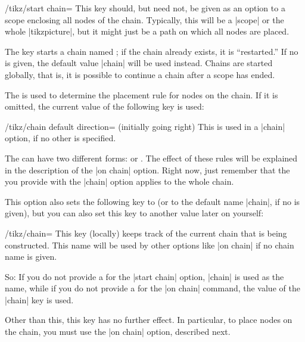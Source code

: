 \begin{key}{/tikz/start chain=}
  This key should, but need not, be given as an option to a scope
  enclosing all nodes of the chain. Typically, this will be a |scope|
  or the whole |tikzpicture|, but it might just be a path on which all
  nodes are placed.

  The key starts a chain named ; if the chain already
  exists, it is ``restarted.'' If no  is given, the
  default value |chain| will be used instead. Chains are started
  globally, that is, it is possible to continue a chain after a scope
  has ended.

  The  is used to determine the placement rule for
  nodes on the chain. If it is omitted, the current value of the
  following key is used:
  \begin{key}{/tikz/chain default direction=
      (initially going right)}
    This  is used in a |chain| option, if no other
     is specified.
  \end{key}

  The  can have two different forms:
   or
  . The effect of these rules will be
  explained in the description of the |on chain| option. Right now,
  just remember that the  you provide with the |chain|
  option applies to the whole chain.
  
  This option also sets the following key to  (or to
  the default name |chain|, if no  is given), but you
  can also set this key to another value later on yourself:
  \begin{key}{/tikz/chain=}
    This key (locally) keeps track of the current chain that is being
    constructed. This name will be used by other options like
    |on chain| if no chain name is given.

    So: If you do not provide a  for the
    |start chain| option, |chain| is used as the name, while if you do not
    provide a  for the |on chain| command, the value
    of the |chain| key is used.
  \end{key}
  Other than this, this key has no further effect. In particular, to
  place nodes on the chain, you must use the |on chain| option,
  described next.

\begin{codeexample}[]
\end{codeexample}


\end{key}
